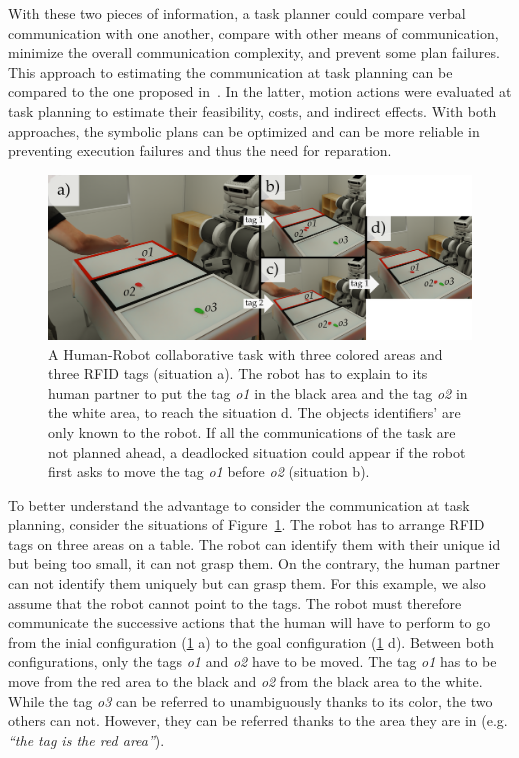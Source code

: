 With these two pieces of information, a task planner could compare verbal communication with one another, compare with other means of communication, minimize the overall communication complexity, and prevent some plan failures. This approach to estimating the communication at task planning can be compared to the one proposed in~\cite{lallement_2016_symbolic}. In the latter, motion actions were evaluated at task planning to estimate their feasibility, costs, and indirect effects. With both approaches, the symbolic plans can be optimized and can be more reliable in preventing execution failures and thus the need for reparation.


\begin{figure}[t!]
\centering
\includegraphics[width=\textwidth]{figures/chapter5/intro/intro.png}
\caption{\label{fig:chap5_intro} A Human-Robot collaborative task with three colored areas and three RFID tags (situation a). The robot has to explain to its human partner to put the tag \textit{o1} in the black area and the tag \textit{o2} in the white area, to reach the situation d. The objects identifiers' are only known to the robot.
If all the communications of the task are not planned ahead, a deadlocked situation could appear if the robot first asks to move the tag \textit{o1} before \textit{o2} (situation b).}
\end{figure}

To better understand the advantage to consider the communication at task planning, consider the situations of Figure~\ref{fig:chap5_intro}. The robot has to arrange RFID tags on three areas on a table. The robot can identify them with their unique id but being too small, it can not grasp them. On the contrary, the human partner can not identify them uniquely but can grasp them. For this example, we also assume that the robot cannot point to the tags. The robot must therefore communicate the successive actions that the human will have to perform to go from the inial configuration (\ref{fig:chap5_intro} a) to the goal configuration (\ref{fig:chap5_intro} d). Between both configurations, only the tags \textit{o1} and \textit{o2} have to be moved. The tag \textit{o1} has to be move from the red area to the black and \textit{o2} from the black area to the white. While the tag \textit{o3} can be referred to unambiguously thanks to its color, the two others can not. However, they can be referred thanks to the area they are in (e.g. \textit{``the tag is the red area''}).


